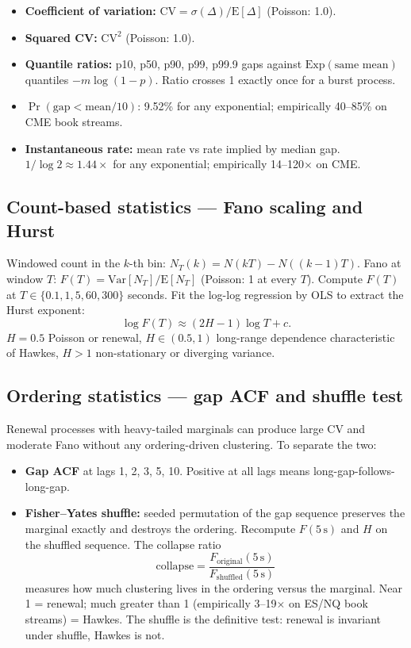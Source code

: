 \begin{itemize}
    \item \textbf{Coefficient of variation:} $\mathrm{CV} = \sigma(\Delta)/\mathrm{E}[\Delta]$ (Poisson: 1.0).
    \item \textbf{Squared CV:} $\mathrm{CV}^2$ (Poisson: 1.0).
    \item \textbf{Quantile ratios:} p10, p50, p90, p99, p99.9 gaps against $\mathrm{Exp}(\text{same mean})$ quantiles $-m \log(1 - p)$. Ratio crosses 1 exactly once for a burst process.
    \item $\Pr(\text{gap} < \text{mean}/10)$: 9.52\% for any exponential; empirically 40--85\% on CME book streams.
    \item \textbf{Instantaneous rate:} mean rate vs rate implied by median gap. $1/\log 2 \approx 1.44 \times$ for any exponential; empirically 14--120$\times$ on CME.
\end{itemize}

\subsection{Count-based statistics --- Fano scaling and Hurst}
\label{app:diag-fano}

Windowed count in the $k$-th bin: $N_T(k) = N(kT) - N((k-1)T)$. Fano at window $T$: $F(T) = \mathrm{Var}[N_T]/\mathrm{E}[N_T]$ (Poisson: 1 at every $T$). Compute $F(T)$ at $T \in \{0.1, 1, 5, 60, 300\}$ seconds. Fit the log-log regression by OLS to extract the Hurst exponent:
$$\log F(T) \approx (2H - 1)\log T + c.$$
$H = 0.5$ Poisson or renewal, $H \in (0.5, 1)$ long-range dependence characteristic of Hawkes, $H > 1$ non-stationary or diverging variance.

\subsection{Ordering statistics --- gap ACF and shuffle test}
\label{app:diag-order}

Renewal processes with heavy-tailed marginals can produce large CV and moderate Fano without any ordering-driven clustering. To separate the two:

\begin{itemize}
    \item \textbf{Gap ACF} at lags 1, 2, 3, 5, 10. Positive at all lags means long-gap-follows-long-gap.
    \item \textbf{Fisher--Yates shuffle:} seeded permutation of the gap sequence preserves the marginal exactly and destroys the ordering. Recompute $F(5\,\mathrm{s})$ and $H$ on the shuffled sequence. The collapse ratio
    $$\text{collapse} = \frac{F_{\text{original}}(5\,\mathrm{s})}{F_{\text{shuffled}}(5\,\mathrm{s})}$$
    measures how much clustering lives in the ordering versus the marginal. Near 1 = renewal; much greater than 1 (empirically 3--19$\times$ on ES/NQ book streams) = Hawkes. The shuffle is the definitive test: renewal is invariant under shuffle, Hawkes is not.
\end{itemize}

